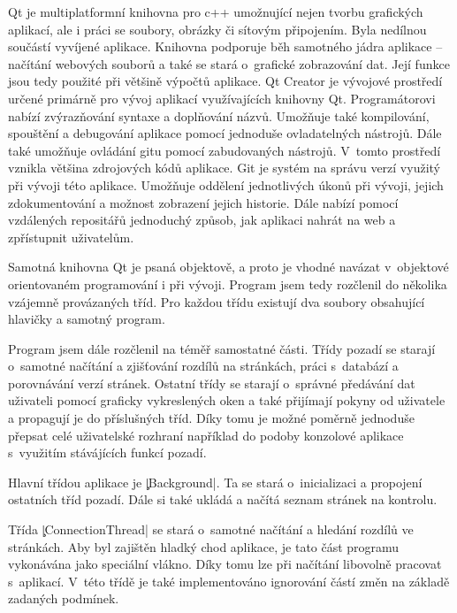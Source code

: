 
Qt je multiplatformní knihovna pro c++ umožnující nejen tvorbu grafických aplikací, ale i práci se soubory, obrázky či sítovým připojením.
Byla nedílnou součástí vyvíjené aplikace.
Knihovna podporuje běh samotného jádra aplikace -- načítání webových souborů a také se stará o~grafické zobrazování dat.
Její funkce jsou tedy použité při většině výpočtů aplikace.
Qt Creator je vývojové prostředí určené primárně pro vývoj aplikací využívajících knihovny Qt.
Programátorovi nabízí zvýrazňování syntaxe a doplňování názvů.
Umožňuje také kompilování, spouštění a debugování aplikace pomocí jednoduše ovladatelných nástrojů.
Dále také umožňuje ovládání gitu pomocí zabudovaných nástrojů.
V~tomto prostředí vznikla většina zdrojových kódů aplikace.
Git je systém na správu verzí využitý při vývoji této aplikace.
Umožňuje oddělení jednotlivých úkonů při vývoji, jejich zdokumentování a možnost zobrazení jejich historie.
Dále nabízí pomocí vzdálených repositářů jednoduchý způsob, jak aplikaci nahrát na web a zpřístupnit uživatelům.

	Samotná knihovna Qt je psaná objektově, a proto je vhodné navázat v~objektové orientovaném programování i při vývoji.
	Program jsem tedy rozčlenil do několika vzájemně provázaných tříd.
	Pro každou třídu existují dva soubory obsahující hlavičky a samotný program.

	Program jsem dále rozčlenil na téměř samostatné části.
	Třídy pozadí se starají o~samotné načítání a zjišťování rozdílů na stránkách, práci s~databází a porovnávání verzí stránek.
	Ostatní třídy se starají o~správné předávání dat uživateli pomocí graficky vykreslených oken a také přijímají pokyny od uživatele a propagují je do příslušných tříd.
	Díky tomu je možné poměrně jednoduše přepsat celé uživatelské rozhraní například do podoby konzolové aplikace s~využitím stávájících funkcí pozadí.


Hlavní třídou aplikace je \c|Background|. Ta se stará o~inicializaci a propojení ostatních tříd pozadí.
Dále si také ukládá a načítá seznam stránek na kontrolu.

Třída \c|ConnectionThread| se stará o~samotné načítání a hledání rozdílů ve stránkách. Aby byl zajištěn hladký chod aplikace, je tato část programu vykonávána jako speciální vlákno. %
Díky tomu lze při načítání libovolně pracovat s~aplikací.
V~této třídě je také implementováno ignorování částí změn na základě zadaných podmínek.

